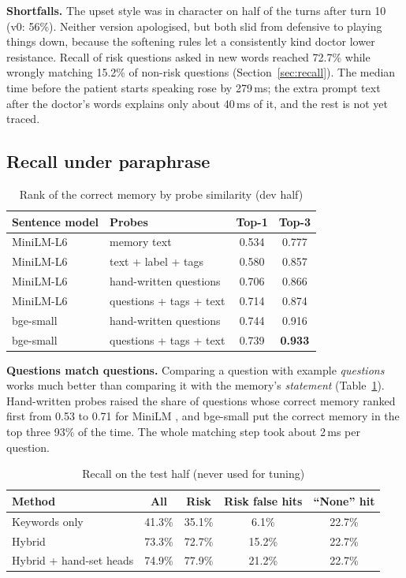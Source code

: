 \documentclass[journal]{IEEEtran}
\begin{document}
\textbf{Shortfalls.} The upset style was in character on half of the turns after turn 10 (v0: 56\%). Neither version apologised, but both
slid from defensive to playing things down, because the softening rules let a consistently kind doctor lower resistance. Recall of risk
questions asked in new words reached 72.7\% while wrongly matching 15.2\% of non-risk questions (Section~\ref{sec:recall}). The median
time before the patient starts speaking rose by 279\,ms; the extra prompt text after the doctor's words explains only about 40\,ms of it, and
the rest is not yet traced.


\subsection{Recall under paraphrase}



\begin{table}[t]
\caption{Rank of the correct memory by probe similarity (dev half)}
\label{p3:tab:ablation}
\centering
\footnotesize
\begin{tabular}{@{}llcc@{}}
\toprule
Sentence model & Probes & Top-1 & Top-3\\
\midrule
MiniLM-L6 \cite{wang2020minilm} & memory text & 0.534 & 0.777\\
MiniLM-L6 & text + label + tags & 0.580 & 0.857\\
MiniLM-L6 & hand-written questions & 0.706 & 0.866\\
MiniLM-L6 & questions + tags + text & 0.714 & 0.874\\
bge-small & hand-written questions & 0.744 & 0.916\\
bge-small & questions + tags + text & 0.739 & \textbf{0.933}\\
\bottomrule
\end{tabular}
\end{table}

\textbf{Questions match questions.} Comparing a question with example \emph{questions} works much better than comparing it with the memory's
\emph{statement} (Table~\ref{p3:tab:ablation}). Hand-written probes raised the share of questions whose correct memory ranked first from 0.53 to 0.71
for MiniLM \cite{wang2020minilm,reimers2019sentencebert}, and bge-small \cite{xiao2023cpack} put the correct memory in the top three 93\% of the
time. The whole matching step took about 2\,ms per question.

\begin{table}[t]
\caption{Recall on the test half (never used for tuning)}
\label{p3:tab:test}
\centering
\footnotesize
\begin{tabular}{@{}lcccc@{}}
\toprule
Method & All & Risk & Risk false hits & ``None'' hit\\
\midrule
Keywords only & 41.3\% & 35.1\% & 6.1\% & 22.7\%\\
Hybrid & 73.3\% & 72.7\% & 15.2\% & 22.7\%\\
Hybrid + hand-set heads & 74.9\% & 77.9\% & 21.2\% & 22.7\%\\
\bottomrule
\end{tabular}
\end{table}
\end{document}
